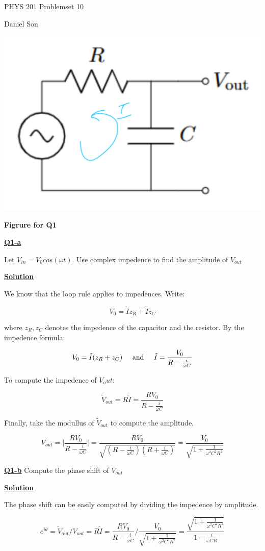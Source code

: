 \documentclass{article}
\newcommand{\new}[1]{
    \vspace{2mm}
    \noindent
    \textbf{
    \underline{#1}}
}
\newcommand{\textAnd}{
    {
        \hspace{5mm}
        \textrm{and}
        \hspace{5mm}
    }
}
\begin{document}
\begin{center}
\LARGE
PHYS 201 Problemset 10

\Large
Daniel Son
\end{center}

\normalsize

\begin{center}
\includegraphics[width = .5\linewidth]{Q1_setup.png}

\textbf{Figrure for Q1}
\end{center}

\new{Q1-a}
Let $V_{in} = V_0 cos(\omega t)$. Use complex impedence to find the 
amplitude of $V_{out}$

\new{Solution}
We know that the loop rule applies to impedences. Write:

\[
    V_0 = \tilde{I}z_R+\tilde{I}z_C
\]

where $z_R, z_C$ denotes the impedence of the capacitor and 
the resistor. By the impedence formula:

\[
    V_0 = \tilde{I}(z_R+z_C)
    \textAnd
    \tilde{I} = \frac{V_0}{R - \frac{i}{\omega C}}
\]

To compute the impedence of $V_out$:

\[
    \tilde{V}_{out} = R\tilde{I} = \frac{RV_0}{R - \frac{i}{\omega C}}
\]

Finally, take the modullus of $\tilde{V}_{out}$ to compute the amplitude.

\[
    \boxed{
    V_{out} = \bigg|
        \frac{RV_0}{R - \frac{i}{\omega C}}
    \bigg|
    = \frac{RV_0}{\sqrt{(R - \frac{i}{\omega C})(R + \frac{i}{\omega C})}}
    = \frac{V_0}{\sqrt{1+\frac{1}{\omega^2 C^2 R^2}}}
    }
\]

\new{Q1-b} Compute the phase shift of $V_{out}$

\new{Solution} 
The phase shift can be easily computed by 
dividing the impedence by amplitude.

\[
    e^{i\theta} = 
    \tilde{V}_{out}/V_{out} 
    = 
R\tilde{I} = \frac{RV_0}{R - \frac{i}{\omega C}}
\bigg/ \frac{V_0}{\sqrt{1+\frac{1}{\omega^2 C^2 R^2}}}
= \frac{\sqrt{1+\frac{1}{\omega^2 C^2 R^2}}}{1 - \frac{i}{\omega CR}}
\]
\end{document}
